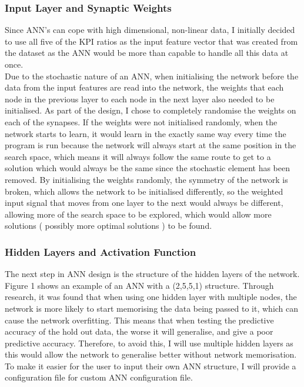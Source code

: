 \documentclass[11pt]{article}
\begin{document}
\subsubsection{Input Layer and Synaptic Weights}
Since ANN's can cope with high dimensional, non-linear data, I initially decided to use all five of the KPI ratios as the input feature vector that was created from the dataset as the ANN would be more than capable to handle all this data at once.\\

Due to the stochastic nature of an ANN, when initialising the network before the data from the input features are read into the network, the weights that each node in the previous layer to each node in the next layer also needed to be initialised. As part of the design, I chose to completely randomise the weights on each of the synapses. If the weights were not initialised randomly, when the network starts to learn, it would learn in the exactly same way every time the program is run because the network will always start at the same position in the search space, which means it will always follow the same route to get to a solution which would always be the same since the stochastic element has been removed.  By initialising the weights randomly, the symmetry of the network is broken, which allows the network to be initialised differently, so the weighted input signal that moves from one layer to the next would always be different, allowing more of the search space to be explored, which would allow more solutions ( possibly more optimal solutions ) to be found.
\subsubsection{Hidden Layers and Activation Function }
The next step in ANN design is the structure of the hidden layers of the network.  Figure 1 shows an example of an ANN with a (2,5,5,1) structure. Through research, it was found that when using one hidden layer with multiple nodes, the network is more likely to start memorising the data being passed to it, which can cause the network overfitting. This means that when testing the predictive accuracy of the hold out data, the worse it will generalise, and give a poor predictive accuracy. Therefore, to avoid this, I will use multiple hidden layers as this would allow the network to generalise better without network memorisation.  To make it easier for the user to input their own ANN structure, I will provide a configuration file for custom ANN configuration file. 
\end{document}
